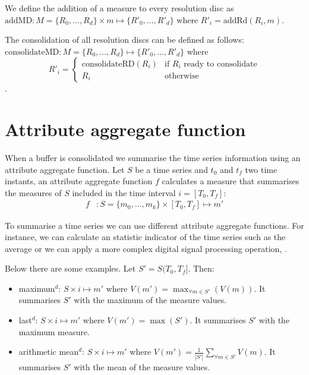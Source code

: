 We define the addition of a measure to every resolution disc as
$\text{addMD} : M=\{R_0, \dots, R_d\} \times m \mapsto \{R'_0, \dots,
R'_d\}$ where $R'_i=\text{addRd}(R_i,m)$.

The consolidation of all resolution discs can be defined as follows:
$\text{consolidateMD}: M=\{R_0, \dots, R_d\} \mapsto \{R'_0, \dots,
R'_d\}$ where
$$ 
R'_i = \begin{cases}
  \text{consolidateRD}(R_i) & \text{if } R_i \text{ ready to consolidate} \\
  R_i                       & \text{otherwise}
\end{cases}
$$.


\section{Attribute aggregate function}
\label{sec:model:interpolador}

When a buffer is consolidated we summarise the time series information
using an attribute aggregate function.  Let $S$ be a time series and
$t_0$ and $t_f$ two time instants, an attribute aggregate function $f$
calculates a measure that summarises the measures of $S$ included in
the time interval $i=[T_0,T_f]$:
\begin{align*}
f&:S=\{m_0,\ldots,m_k\} \times [T_0,T_f] \mapsto m'
\end{align*}

To summarise a time series we can use different attribute aggregate
functions.  For instance, we can calculate an statistic indicator of
the time series such as the average or we can apply a more complex
digital signal processing operation, \cite{zhang11}.

Below there are some examples. Let $S'=S(T_0,T_f]$. Then:
\begin{itemize}
\renewcommand{\labelitemi}{--}
\item maximum$^d$: $S \times i \mapsto m'$ where $V(m') =
  \max_{\forall m \in S'}(V(m))$. It summarises $S'$ with the maximum
  of the measure values.
\item last$^d$: $S \times i \mapsto m'$ where $V(m') = \max(S')$. It
  summarises $S'$ with the maximum measure.
\item arithmetic mean$^d$: $S \times i \mapsto m'$ where $V(m') =
  \frac{1}{|S'|} \sum\limits_{\forall m\in S'} V(m)$. It
  summarises $S'$ with the mean of the measure values.
\end{itemize}

